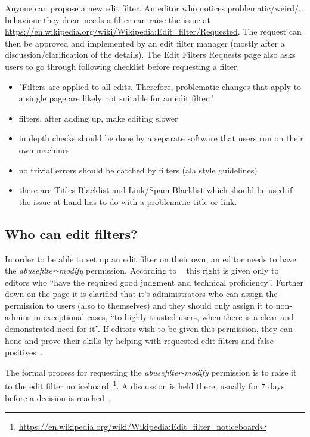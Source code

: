 Anyone can propose a new edit filter.
An editor who notices problematic/weird/.. behaviour they deem needs a filter can raise the issue at \url{https://en.wikipedia.org/wiki/Wikipedia:Edit_filter/Requested}.
The request can then be approved and implemented by an edit filter manager (mostly after a discussion/clarification of the details).
The Edit Filters Requests page also asks users to go through following checklist before requesting a filter:
\begin{itemize}
    \item "Filters are applied to all edits. Therefore, problematic changes that apply to a single page are likely not suitable for an edit filter."
    \item filters, after adding up, make editing slower
    \item in depth checks should be done by a separate software that users run on their own machines
    \item no trivial errors should be catched by filters (ala style guidelines)
    \item there are Titles Blacklist and Link/Spam Blacklist which should be used if the issue at hand has to do with a problematic title or link.
\end{itemize}


\subsection{Who can edit filters?}
\label{section:who-can-edit}

In order to be able to set up an edit filter on their own, an editor needs to have the \emph{abusefilter-modify} permission.
According to ~\cite{Wikipedia:EditFilter} this right is given only to editors who ``have the required good judgment and technical proficiency''.
Further down on the page it is clarified that it's administrators who can assign the permission to users (also to themselves) and they should only assign it to non-admins in exceptional cases, ``to highly trusted users, when there is a clear and demonstrated need for it''.
If editors wish to be given this permission, they can hone and prove their skills by helping with requested edit filters and false positives~\cite{Wikipedia:EditFilter}.

The formal process for requesting the \emph{abusefilter-modify} permission is to raise it to the edit filter noticeboard~\footnote{\url{https://en.wikipedia.org/wiki/Wikipedia:Edit_filter_noticeboard}}.
A discussion is held there, usually for 7 days, before a decision is reached~\cite{Wikipedia:EditFilter}.

